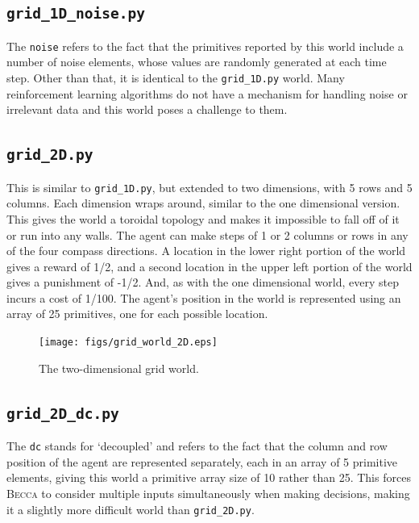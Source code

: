 \subsection{\texttt{grid\_1D\_noise.py}}

The \texttt{noise} refers to the fact that the primitives reported by this world include a number of noise elements, whose values are randomly generated at each time step. Other than that, it is identical to the  \texttt{grid\_1D.py} world. Many reinforcement learning algorithms do not have a mechanism for handling noise or irrelevant data and this world poses a challenge to them. 

\subsection{\texttt{grid\_2D.py}}

This is similar to \texttt{grid\_1D.py}, but extended to two dimensions, with 5 rows and 5 columns. Each dimension wraps around, similar to the one dimensional version. This gives the world a toroidal topology and makes it impossible to fall off of it or run into any walls. The agent can make steps of 1 or 2 columns or rows in any of the four compass directions. A location in the lower right portion of the world gives a reward of 1/2, and a second location in the upper left portion of the world gives a punishment of -1/2. And, as with the one dimensional world, every step incurs a cost of 1/100. The agent's position in the world is represented using an array of 25 primitives, one for each possible location. 

\begin{figure}
\centering
\texttt{[image: figs/grid\_world\_2D.eps]}
\caption{The two-dimensional grid world.}
\label{grid_2D}
\end{figure}

\subsection{\texttt{grid\_2D\_dc.py}}

The \texttt{dc} stands for `decoupled' and refers to the fact that the column and row position of the agent are represented separately, each in an array of 5 primitive elements, giving this world a primitive array size of 10 rather than 25. This forces \textsc{Becca} to consider multiple inputs simultaneously when making decisions, making it a slightly more difficult world than \texttt{grid\_2D.py}.

